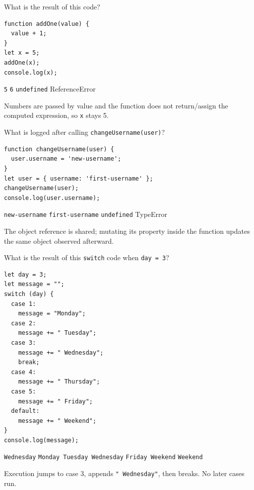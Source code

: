 \question[4]
What is the result of this code?
\begin{lstlisting}[style=jsexam]
function addOne(value) {
  value + 1;
}
let x = 5;
addOne(x);
console.log(x);
\end{lstlisting}
\begin{choices}
  \CorrectChoice \texttt{5}
  \choice \texttt{6}
  \choice \texttt{undefined}
  \choice ReferenceError
\end{choices}
\begin{solution}
  Numbers are passed by value and the function does not return/assign the computed expression, so \texttt{x} stays 5.
\end{solution}

\question[4]
What is logged after calling \texttt{changeUsername(user)}?
\begin{lstlisting}[style=jsexam]
function changeUsername(user) {
  user.username = 'new-username';
}
let user = { username: 'first-username' };
changeUsername(user);
console.log(user.username);
\end{lstlisting}
\begin{choices}
  \CorrectChoice \texttt{new-username}
  \choice \texttt{first-username}
  \choice \texttt{undefined}
  \choice TypeError
\end{choices}
\begin{solution}
  The object reference is shared; mutating its property inside the function updates the same object observed afterward.
\end{solution}

\question[4]
What is the result of this \texttt{switch} code when \texttt{day = 3}?
\begin{lstlisting}[style=jsexam]
let day = 3;
let message = "";
switch (day) {
  case 1:
    message = "Monday";
  case 2:
    message += " Tuesday";
  case 3:
    message += " Wednesday";
    break;
  case 4:
    message += " Thursday";
  case 5:
    message += " Friday";
  default:
    message += " Weekend";
}
console.log(message);
\end{lstlisting}
\begin{choices}
  \CorrectChoice \texttt{Wednesday}
  \choice \texttt{Monday Tuesday Wednesday}
  \choice \texttt{Friday Weekend}
  \choice \texttt{Weekend}
\end{choices}
\begin{solution}
  Execution jumps to case 3, appends \texttt{" Wednesday"}, then breaks. No later cases run.
\end{solution}

